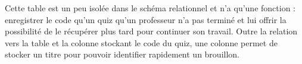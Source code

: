 \documentclass[a4,10pt,french]{sphinxmanual}
\begin{document}

\begin{fulllineitems}
\label{database:quiz.models.QuizDraft}
Cette table est un peu isolée dans le schéma relationnel et n'a qu'une fonction :
enregistrer le code qu'un quiz qu'un professeur n'a pas terminé et lui offrir
la possibilité de le récupérer plus tard pour continuer son travail.
Outre la relation vers la table  et la colonne stockant le code du
quiz, une colonne permet de stocker un titre pour pouvoir identifier rapidement
un brouillon.

\end{fulllineitems}

\end{document}
